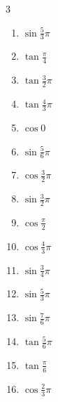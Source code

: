 \begin{multicols}{3}
\begin{enumerate}
  \item $\displaystyle \sin{\frac{5}{3}\pi}$

  \item $\displaystyle \tan{\frac{\pi}{4}}$
        \phantom{$\displaystyle =1$}

  \item $\displaystyle \tan{\frac{3}{2}\pi}$
        \phantom{$\displaystyle \quad なし$}

  \item $\displaystyle \tan{\frac{4}{3}\pi}$

  \item $\displaystyle \cos{0}$
        \phantom{$\displaystyle =1$}

  \item $\displaystyle \sin{\frac{5}{6}\pi}$

  \item $\displaystyle \cos{\frac{3}{2}\pi}$
        \phantom{$\displaystyle =0$}

  \item $\displaystyle \sin{\frac{3}{2}\pi}$
        \phantom{$\displaystyle =-1$}

  \item $\displaystyle \cos{\frac{\pi}{2}}$
        \phantom{$\displaystyle =0$}

  \item $\displaystyle \cos{\frac{4}{3}\pi}$

  \item $\displaystyle \sin{\frac{3}{4}\pi}$

  \item $\displaystyle \sin{\frac{5}{3}\pi}$

  \item $\displaystyle \sin{\frac{7}{6}\pi}$

  \item $\displaystyle \tan{\frac{5}{6}\pi}$

  \item $\displaystyle \tan{\frac{\pi}{6}}$

  \item $\displaystyle \cos{\frac{2}{3}\pi}$


\end{enumerate}
\end{multicols}
